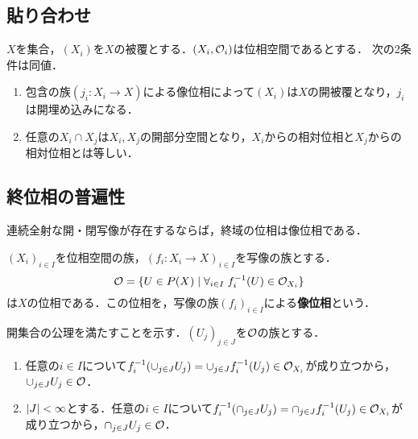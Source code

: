 \documentclass[uplatex,dvipdfmx]{jsreport}
\begin{document}
\subsection{貼り合わせ}

\begin{theorem}[位相の族の貼り合わせの条件]
    $X$を集合，$(X_i)$を$X$の被覆とする．$(X_i,\mathcal{O}_i)$は位相空間であるとする．
    次の2条件は同値．
    \begin{enumerate}
        \item 包含の族$(j_i:X_i\to X)$による像位相によって$(X_i)$は$X$の開被覆となり，$j_i$は開埋め込みになる．
        \item 任意の$X_i\cap X_j$は$X_i,X_j$の開部分空間となり，$X_i$からの相対位相と$X_j$からの相対位相とは等しい．
    \end{enumerate}
\end{theorem}

\subsection{終位相の普遍性}

\begin{tcolorbox}[colframe=ForestGreen, colback=ForestGreen!10!white,breakable,colbacktitle=ForestGreen!40!white,coltitle=black,fonttitle=\bfseries\sffamily,
title=]
    連続全射な開・閉写像が存在するならば，終域の位相は像位相である．
\end{tcolorbox}

\begin{proposition}[像位相の特徴付け]
    $(X_i)_{i\in I}$を位相空間の族，$(f_i:X_i\to X)_{i\in I}$を写像の族とする．
    \[ \mathcal{O}=\{U\in P(X)\mid \forall_{i\in I}\; f^{-1}_i(U)\in\mathcal{O}_{X_i}\} \]
    は$X$の位相である．この位相を，写像の族$(f_i)_{i\in I}$による\textbf{像位相}という．
\end{proposition}
\begin{Proof}
    開集合の公理を満たすことを示す．$(U_j)_{j\in J}$を$\mathcal{O}$の族とする．
    \begin{enumerate}
        \item 任意の$i\in I$について$f^{-1}_i(\cup_{j\in J}U_j)=\cup_{j\in J}f^{-1}_i(U_j)\in\mathcal{O}_{X_i}$が成り立つから，$\cup_{j\in J}U_j\in\mathcal{O}$．
        \item $\lvert J\rvert<\infty$とする．任意の$i\in I$について$f^{-1}_i(\cap_{j\in J}U_j)=\cap_{j\in J}f^{-1}_i(U_j)\in\mathcal{O}_{X_i}$が成り立つから，$\cap_{j\in J}U_j\in\mathcal{O}$．
    \end{enumerate}
\end{Proof}
\end{document}
